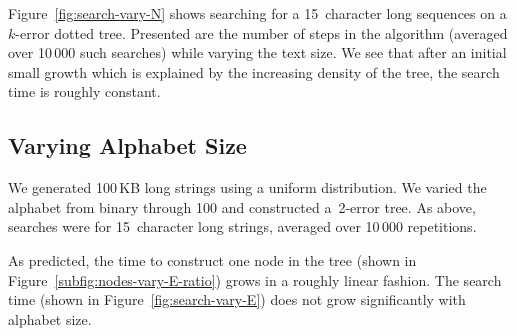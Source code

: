 Figure~\ref{fig:search-vary-N} shows searching for a 15~character long sequences on a $k$-error dotted tree. Presented are the number of steps in the algorithm (averaged over 10\,000 such searches) while varying the text size. We see that after an initial small growth which is explained by the increasing density of the tree, the search time is roughly constant.

\subsection{Varying Alphabet Size}
%
\begin{figure*}
\centering
{}
\caption{Construction time versus $|\Sigma|$}\label{fig:nodes-vary-E}
\end{figure*}%
%
\begin{figure*}
\centering
{}%
\caption{Searching versus $|\Sigma|$}\label{fig:search-vary-E}
\end{figure*}%
%
We generated 100\,KB long strings using a uniform distribution. We varied the alphabet from binary through 100 and constructed a~2-error tree. As above, searches were for 15~character long strings, averaged over 10\,000 repetitions.

As predicted, the time to construct one node in the tree (shown in Figure~\ref{subfig:nodes-vary-E-ratio}) grows in a roughly linear fashion. The search time (shown in Figure~\ref{fig:search-vary-E}) does not grow significantly with alphabet size.
